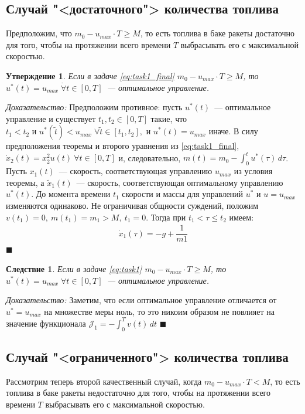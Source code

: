 \documentclass[11pt, oneside, final]{article}
\theoremstyle{break}
\numberwithin{equation}{section}
\theoremstyle{plain}
\newtheorem*{corollary*}{Следствие}
\newtheorem*{statement}{Утверждение}
\theoremstyle{definition}
\renewenvironment{proof}{
\noindent\textit{Доказательство: }} {\qed}
\renewcommand \qed{$\blacksquare$}
\begin{document}
    \subsection{Случай "<достаточного"> количества топлива}
    Предположим, что \(m_0 - u_{max} \cdot T \geqslant M\), то есть топлива в баке ракеты достаточно для того, чтобы на протяжении всего времени \(T\) выбрасывать его с максимальной скоростью.
    \begin{statement} 
        \label{st:enough}
        Если в задаче \eqref{eq:task1_final} \(m_0 - u_{max} \cdot T \geqslant M\), то \(u^*(t) = u_{max}\; \dot \forall t \in [0, T] \)~--- оптимальное управление.
    \end{statement}
    \begin{proof}
        Предположим противное: пусть \(u^*(t)\)~--- оптимальное управление и существует 
        \(t_1, t_2 \in [0, T]\) такие, что \(t_1 < t_2 \text{ и } u^*(\tilde t) < u_{max} \;\forall \tilde t \in [t_1, t_2],\) и \( u^*(t) = u_{max}\) иначе. В силу предположения теоремы и второго уравнения из \eqref{eq:task1_final}, \(\dot x_2(t) = x_2^2u(t) \: \forall t \in [0, T]\) и, следовательно, \(m(t) = m_0 - \int_0^t{u^*(\tau)\,d\tau}\). Пусть \(x_1(t)\)~--- скорость, соответствующая управлению \(u_{max}\) из условия теоремы, а \(\tilde x_1(t)\)~--- скорость, соответствующая оптимальному управлению \(u^*(t)\).
        До момента времени \(t_1\) скорости и массы для управлений \(u^*\) и \(u = u_{max}\) изменяются одинаково. Не ограничивая общности суждений, положим \(v(t_1) = 0,\:m(t_1) = m_1 > M, \: t_1 = 0\). Тогда при \(t_1 < \tau \leqslant t_2\) имеем:
        \begin{gather*}
        \dot x_1(\tau) = -g + \dfrac{1}{m1} 
        \end{gather*}
    \end{proof}
    \begin{corollary*}
        Если в задаче \eqref{eq:task1} \(m_0 - u_{max} \cdot T \geqslant M\), то \(u^*(t) = u_{max}\; \forall t \in [0, T] \)~--- оптимальное управление.
    \end{corollary*}
    \begin{proof}
        Заметим, что если оптимальное управление отличается от \(u^* = u_{max}\) на множестве меры ноль, то это никоим образом не повлияет на значение функционала \(\mathcal{J}_1 = - \int_0^T{v(t) \, dt} \)
    \end{proof}
    \subsection{Случай "<ограниченного"> количества топлива}
    Рассмотрим теперь второй качественный случай, когда \(m_0 - u_{max} \cdot T < M\), то есть топлива в баке ракеты недостаточно для того, чтобы на протяжении всего времени \(T\) выбрасывать его с максимальной скоростью.
\end{document}
